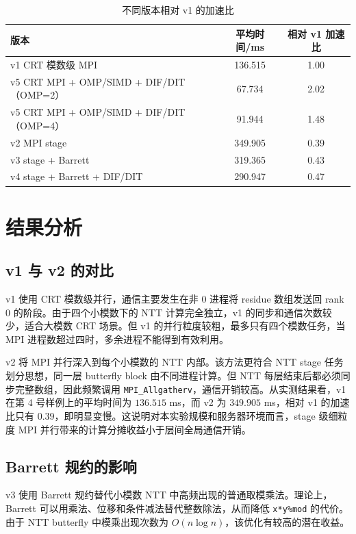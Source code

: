 \documentclass[a4paper]{article}
\begin{document}
\begin{table}[H]
  \centering
  \caption{不同版本相对 v1 的加速比}
  \label{tab:speedup}
  \begin{tabular}{l c c}
    \toprule
    版本 & 平均时间/ms & 相对 v1 加速比 \\
    \midrule
    v1 CRT 模数级 MPI & 136.515 & 1.00 \\
    v5 CRT MPI + OMP/SIMD + DIF/DIT（OMP=2） & 67.734 & 2.02 \\
    v5 CRT MPI + OMP/SIMD + DIF/DIT（OMP=4） & 91.944 & 1.48 \\
    v2 MPI stage & 349.905 & 0.39 \\
    v3 stage + Barrett & 319.365 & 0.43 \\
    v4 stage + Barrett + DIF/DIT & 290.947 & 0.47 \\
    \bottomrule
  \end{tabular}
\end{table}

\section{结果分析}

\subsection{v1 与 v2 的对比}

v1 使用 CRT 模数级并行，通信主要发生在非 0 进程将 residue 数组发送回 rank 0 的阶段。由于四个小模数下的 NTT 计算完全独立，v1 的同步和通信次数较少，适合大模数 CRT 场景。但 v1 的并行粒度较粗，最多只有四个模数任务，当 MPI 进程数超过四时，多余进程不能得到有效利用。

v2 将 MPI 并行深入到每个小模数的 NTT 内部。该方法更符合 NTT stage 任务划分思想，同一层 butterfly block 由不同进程计算。但 NTT 每层结束后都必须同步完整数组，因此频繁调用 \texttt{MPI\_Allgatherv}，通信开销较高。从实测结果看，v1 在第 4 号样例上的平均时间为 $136.515$ ms，而 v2 为 $349.905$ ms，相对 v1 的加速比只有 $0.39$，即明显变慢。这说明对本实验规模和服务器环境而言，stage 级细粒度 MPI 并行带来的计算分摊收益小于层间全局通信开销。

\subsection{Barrett 规约的影响}

v3 使用 Barrett 规约替代小模数 NTT 中高频出现的普通取模乘法。理论上，Barrett 可以用乘法、位移和条件减法替代整数除法，从而降低 \texttt{x*y\%mod} 的代价。由于 NTT butterfly 中模乘出现次数为 $O(n\log n)$，该优化有较高的潜在收益。
\end{document}
